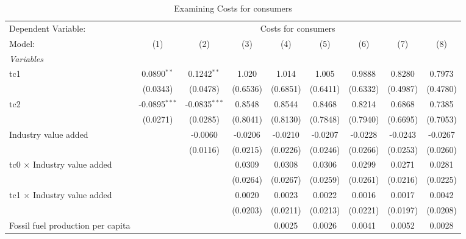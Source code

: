
\begin{table}[htbp]
   \caption{Examining Costs for consumers}
   \centering
   \begin{tabular}{lcccccccc}
      \tabularnewline \midrule \midrule
      Dependent Variable: & \multicolumn{8}{c}{Costs for consumers}\\
      Model:                                  & (1)             & (2)             & (3)      & (4)      & (5)      & (6)      & (7)      & (8)\\  
      \midrule
      \emph{Variables}\\
      tc1                                     & 0.0890$^{**}$   & 0.1242$^{**}$   & 1.020    & 1.014    & 1.005    & 0.9888   & 0.8280   & 0.7973\\   
                                              & (0.0343)        & (0.0478)        & (0.6536) & (0.6851) & (0.6411) & (0.6332) & (0.4987) & (0.4780)\\   
      tc2                                     & -0.0895$^{***}$ & -0.0835$^{***}$ & 0.8548   & 0.8544   & 0.8468   & 0.8214   & 0.6868   & 0.7385\\   
                                              & (0.0271)        & (0.0285)        & (0.8041) & (0.8130) & (0.7848) & (0.7940) & (0.6695) & (0.7053)\\   
      Industry value added                    &                 & -0.0060         & -0.0206  & -0.0210  & -0.0207  & -0.0228  & -0.0243  & -0.0267\\   
                                              &                 & (0.0116)        & (0.0215) & (0.0226) & (0.0246) & (0.0266) & (0.0253) & (0.0260)\\   
      tc0 $\times$ Industry value added       &                 &                 & 0.0309   & 0.0308   & 0.0306   & 0.0299   & 0.0271   & 0.0281\\   
                                              &                 &                 & (0.0264) & (0.0267) & (0.0259) & (0.0261) & (0.0216) & (0.0225)\\   
      tc1 $\times$ Industry value added       &                 &                 & 0.0020   & 0.0023   & 0.0022   & 0.0016   & 0.0017   & 0.0042\\   
                                              &                 &                 & (0.0203) & (0.0211) & (0.0213) & (0.0221) & (0.0197) & (0.0208)\\   
      Fossil fuel production per capita       &                 &                 &          & 0.0025   & 0.0026   & 0.0041   & 0.0052   & 0.0028\\   

\end{tabular}
\end{table}
